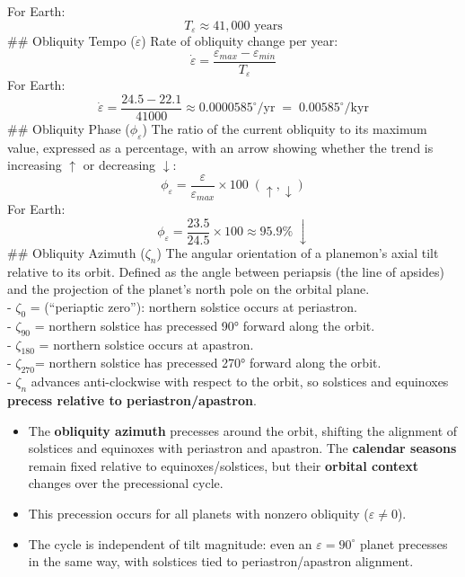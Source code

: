 \documentclass[
  letterpaper,
]{book}
\providecommand{\tightlist}{%
  \setlength{\itemsep}{0pt}\setlength{\parskip}{0pt}}
\begin{document}
For Earth:\\
\[
T_\varepsilon \approx 41{,}000 \text{ years}
\] \#\# Obliquity Tempo (\(\dot{\varepsilon}\)) Rate of obliquity change
per year:\\
\[
\dot{\varepsilon} = \dfrac{\varepsilon_{max} - \varepsilon_{min}}{T_\varepsilon}
\] For Earth:\\
\[
\dot{\varepsilon} = \frac{24.5 - 22.1}{41000} ≈ 0.0000585^\circ/\text{yr} \;=\; 0.00585^\circ/\text{kyr}
\] \#\# Obliquity Phase (\(\phi_\varepsilon\)) The ratio of the current
obliquity to its maximum value, expressed as a percentage, with an arrow
showing whether the trend is increasing \(\uparrow\) or decreasing
\(\downarrow\): \[
\phi_\varepsilon = \dfrac{\varepsilon}{\varepsilon_{max}}\times 100 \; (\uparrow,\downarrow)
\] For Earth:\\
\[
\phi_\varepsilon = \dfrac{23.5}{24.5}\times 100 \approx 95.9\text{\%}\;\downarrow
\] \#\# Obliquity Azimuth (\(\zeta_{n}\)) The angular orientation of a
planemon's axial tilt relative to its orbit. Defined as the angle
between periapsis (the line of apsides) and the projection of the
planet's north pole on the orbital plane.\\
- \(\zeta_{0}\) = (``periaptic zero''): northern solstice occurs at
periastron.\\
- \(\zeta_{90}\) = northern solstice has precessed 90° forward along the
orbit.\\
- \(\zeta_{180}\) = northern solstice occurs at apastron.\\
- \(\zeta_{270}\)= northern solstice has precessed 270° forward along
the orbit.\\
- \(\zeta_{n}\) advances anti-clockwise with respect to the orbit, so
solstices and equinoxes \textbf{precess relative to
periastron/apastron}.

\begin{itemize}
\tightlist
\item
  The \textbf{obliquity azimuth} precesses around the orbit, shifting
  the alignment of solstices and equinoxes with periastron and apastron.
  The \textbf{calendar seasons} remain fixed relative to
  equinoxes/solstices, but their \textbf{orbital context} changes over
  the precessional cycle.
\item
  This precession occurs for all planets with nonzero obliquity
  (\(\varepsilon \neq 0\)).\\
\item
  The cycle is independent of tilt magnitude: even an
  \(\varepsilon = 90^\circ\) planet precesses in the same way, with
  solstices tied to periastron/apastron alignment.
\end{itemize}
\end{document}
